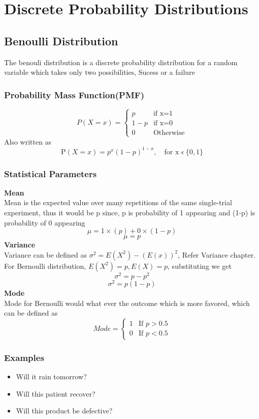 \documentclass[12pt]{extarticle}
\begin{document}
\section{Discrete Probability Distributions}
\subsection{Benoulli Distribution}
The benouli distribution is a discrete probability distribution for a random variable which takes only two possibilities, Sucess or a failure 
\subsubsection{Probability Mass Function(PMF)}
$$
P(X=x) = 
\begin{cases}
    p & \text{if x=1} \\
    1-p & \text{if x=0} \\
    0 & \text{Otherwise}
\end{cases}
$$
Also written as 
$$ \mathrm{P}(X=x) = p^x(1-p)^{1-x}, \quad \text{for x }\epsilon \ \{0,1\}$$

\subsubsection{Statistical Parameters}
\textbf{Mean}\\
Mean is the expected value over many repetitions of the same single-trial experiment,
thus it would be p since, p is probability of 1 appearing and (1-p) is probability of 0 appearing
$$\mu = 1 \times (p)+0 \times (1-p)$$
$$\mu = p$$
\textbf{Variance}\\
Variance can be defined as \( \sigma^2 = E(X^2) - (E(x))^2\), Refer Variance chapter. 
For Bernoulli distribution, \(E(X^2) = p, E(X) = p\), substituting we get
$$\sigma^2 = p - p^2$$
$$\sigma^2 = p(1-p)$$
\textbf{Mode}\\
Mode for Bernoulli would what ever the outcome which is more favored, which can be defined as  
$$
Mode = 
\begin{cases}
    1 & \text{If \(p > 0.5 \)}  \\
    0 & \text{If \(p < 0.5\)}
\end{cases}
$$
\subsubsection{Examples}
\begin{itemize}
    \item Will it rain tomorrow?
    \item Will this patient recover?
    \item Will this product be defective?
\end{itemize}
\end{document}
